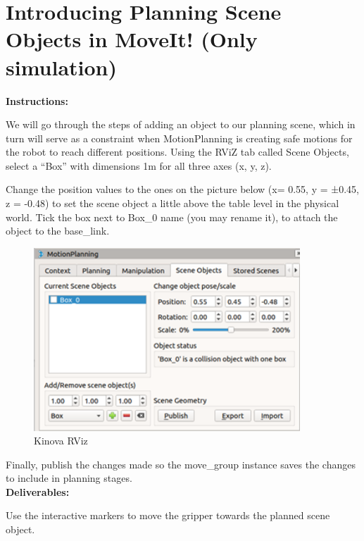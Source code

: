\documentclass[12pt]{article}
\begin{document}
\section{Introducing Planning Scene Objects in MoveIt! (Only simulation)}

\textbf{Instructions:}

We will go through the steps of adding an object to our planning scene, which in turn will serve as a constraint when MotionPlanning is creating safe motions for the robot to reach different positions. Using the RViZ tab called Scene Objects, select a “Box” with dimensions 1m for all three axes (x, y, z).

Change the position values to the ones on the picture below (x= 0.55, y = ±0.45, z = -0.48) to set the scene object a little above the table level in the physical world. 
Tick the box next to Box\_0 name (you may rename it), to attach the object to the base\_link.

\begin{figure}[H]
    \centering\includegraphics[width=10cm]{images/motionPlanning.png}
    \caption{Kinova RViz}\label{fig:kinovarviz}
    \end{figure}

Finally, publish the changes made so the move\_group instance saves the changes to include in planning stages.\\

\textbf{Deliverables:}

Use the interactive markers to move the gripper towards the planned scene object.
\end{document}

